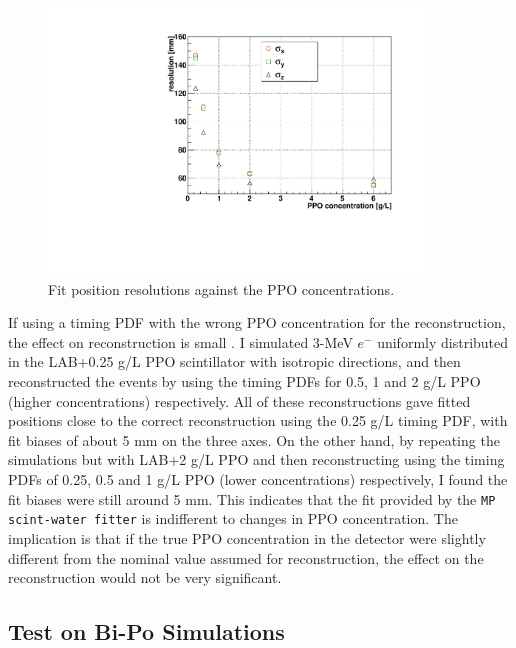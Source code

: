 \begin{figure}[!htb]
	\centering
	\includegraphics[width=10cm]{partialResolVsPPO.pdf}
	\caption{Fit position resolutions against the PPO concentrations.	\label{fig:partialResolVsPPO}}
\end{figure}

If using a timing PDF with the wrong PPO concentration for the reconstruction, the effect on reconstruction is small \cite{partialFitterPDFtestInvulnerable}. I simulated 3-MeV $e^-$ uniformly distributed in the LAB+0.25 g/L PPO scintillator with isotropic directions, and then reconstructed the events by using the timing PDFs for 0.5, 1 and 2 g/L PPO (higher concentrations) respectively. All of these reconstructions gave fitted positions close to the correct reconstruction using the 0.25 g/L timing PDF, with fit biases of about 5 mm on the three axes. On the other hand, by repeating the simulations but with LAB+2 g/L PPO and then reconstructing using the timing PDFs of 0.25, 0.5 and 1 g/L PPO (lower concentrations) respectively, I found the fit biases were still around 5 mm. This indicates that the fit provided by the \texttt{MP scint-water fitter} is indifferent to changes in PPO concentration. The implication is that if the true PPO concentration in the detector were slightly different from the nominal value assumed for reconstruction, the effect on the reconstruction would not be very significant.

\subsection{Test on Bi-Po Simulations}\label{sect:bipo}

